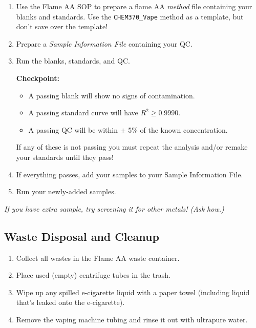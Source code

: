 \documentclass[]{tufte-book}
\providecommand{\tightlist}{%
  \setlength{\itemsep}{0pt}\setlength{\parskip}{0pt}}
\begin{document}
\begin{enumerate}
\def\labelenumi{\arabic{enumi}.}
\item
  Use the Flame AA SOP to prepare a flame AA \emph{method} file containing your blanks and standards. Use the \texttt{CHEM370\_Vape} method as a template, but don't save over the template!
\item
  Prepare a \emph{Sample Information File} containing your QC.
\item
  Run the blanks, standards, and QC.

  \begin{marginfigure}
   \textbf{Checkpoint:}

   \begin{itemize}
   \tightlist
   \item
     A passing blank will show no signs of contamination.\\
   \item
     A passing standard curve will have \(R^2 \ge 0.9990\).\\
   \item
     A passing QC will be within \(\pm\) 5\% of the known concentration.
   \end{itemize}

   If any of these is not passing you must repeat the analysis and/or
   remake your standards until they pass!
   \end{marginfigure}
\item
  If everything passes, add your samples to your Sample Information File.
\item
  Run your newly-added samples.
\end{enumerate}

\emph{If you have extra sample, try screening it for other metals! (Ask how.)}

\hypertarget{waste-disposal-and-cleanup-1}{%
\subsection{Waste Disposal and Cleanup}\label{waste-disposal-and-cleanup-1}}

\begin{enumerate}
\def\labelenumi{\arabic{enumi}.}
\tightlist
\item
  Collect all wastes in the Flame AA waste container.
\item
  Place used (empty) centrifuge tubes in the trash.
\item
  Wipe up any spilled e-cigarette liquid with a paper towel (including liquid that's leaked onto the e-cigarette).
\item
  Remove the vaping machine tubing and rinse it out with ultrapure water.
\end{enumerate}
\end{document}
